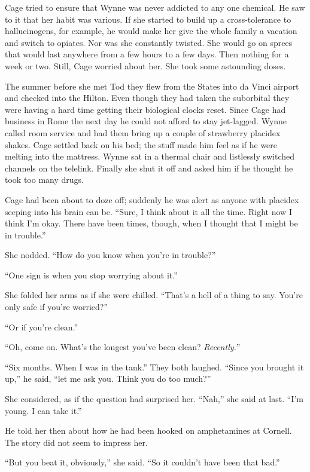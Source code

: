 Cage tried to ensure that Wynne was never addicted to any one chemical. He saw to it that her habit was various. If she started to build up a cross-tolerance to hallucinogens, for example, he would make her give the whole family a vacation and switch to opiates. Nor was she constantly twisted. She would go on sprees that would last anywhere from a few hours to a few days. Then nothing for a week or two. Still, Cage worried about her. She took some astounding doses.

The summer before she met Tod they flew from the States into da Vinci airport and checked into the Hilton. Even though they had taken the suborbital they were having a hard time getting their biological clocks reset. Since Cage had business in Rome the next day he could not afford to stay jet-lagged. Wynne called room service and had them bring up a couple of strawberry placidex shakes. Cage settled back on his bed; the stuff made him feel as if he were melting into the mattress. Wynne sat in a thermal chair and listlessly switched channels on the telelink. Finally she shut it off and asked him if he thought he took too many drugs.

Cage had been about to doze off; suddenly he was alert as anyone with placidex seeping into his brain can be. ``Sure, I think about it all the time. Right now I think I'm okay. There have been times, though, when I thought that I might be in trouble.''

She nodded. ``How do you know when you're in trouble?''

``One sign is when you stop worrying about it.''

She folded her arms as if she were chilled. ``That's a hell of a thing to say. You're only safe if you're worried?''

``Or if you're clean.''

``Oh, come on. What's the longest you've been clean? \textit{Recently.}''

``Six months. When I was in the tank.'' They both laughed. ``Since you brought it up,'' he said, ``let me ask you. Think you do too much?''

She considered, as if the question had surprised her. ``Nah,'' she said at last. ``I'm young. I can take it.''

He told her then about how he had been hooked on amphetamines at Cornell. The story did not seem to impress her.

``But you beat it, obviously,'' she said. ``So it couldn't have been that bad.''

